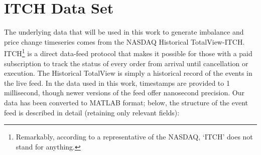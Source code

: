 \section{ITCH Data Set}
The underlying data that will be used in this work to generate imbalance and price change timeseries comes from the NASDAQ Historical TotalView-ITCH. ITCH\footnote{Remarkably, according to a representative of the NASDAQ, `ITCH' does not stand for anything.} is a  direct data-feed protocol that makes it possible for those with a paid subscription to track the status of every order from arrival until cancellation or execution. The Historical TotalView is simply a historical record of the events in the live feed. In the data used in this work, timestamps are provided to 1 millisecond, though newer versions of the feed offer nanosecond precision. Our data has been converted to MATLAB format; below, the structure of the event feed is described in detail (retaining only relevant fields):

